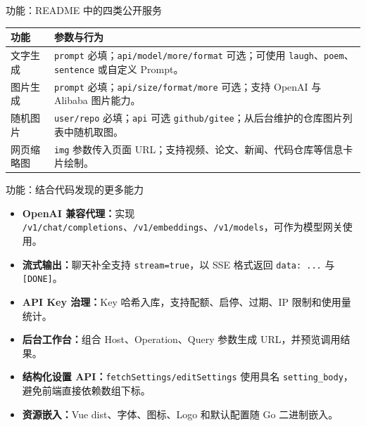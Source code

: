 \documentclass[aspectratio=169,UTF8]{ctexbeamer}
\newcommand{\code}[1]{\texttt{#1}}
\begin{document}
\begin{frame}{功能：README 中的四类公开服务}
  \begin{table}
    \small
    \begin{tabularx}{\linewidth}{lX}
      \toprule
      功能 & 参数与行为 \\
      \midrule
      文字生成 & \code{prompt} 必填；\code{api/model/more/format} 可选；可使用 \code{laugh}、\code{poem}、\code{sentence} 或自定义 Prompt。 \\
      图片生成 & \code{prompt} 必填；\code{api/size/format/more} 可选；支持 OpenAI 与 Alibaba 图片能力。 \\
      随机图片 & \code{user/repo} 必填；\code{api} 可选 \code{github/gitee}；从后台维护的仓库图片列表中随机取图。 \\
      网页缩略图 & \code{img} 参数传入页面 URL；支持视频、论文、新闻、代码仓库等信息卡片绘制。 \\
      \bottomrule
    \end{tabularx}
  \end{table}
\end{frame}

\begin{frame}{功能：结合代码发现的更多能力}
  \begin{itemize}
    \item \textbf{OpenAI 兼容代理：}实现 \code{/v1/chat/completions}、\code{/v1/embeddings}、\code{/v1/models}，可作为模型网关使用。
    \item \textbf{流式输出：}聊天补全支持 \code{stream=true}，以 SSE 格式返回 \code{data: ...} 与 \code{[DONE]}。
    \item \textbf{API Key 治理：}Key 哈希入库，支持配额、启停、过期、IP 限制和使用量统计。
    \item \textbf{后台工作台：}组合 Host、Operation、Query 参数生成 URL，并预览调用结果。
    \item \textbf{结构化设置 API：}\code{fetchSettings/editSettings} 使用具名 \code{setting\_body}，避免前端直接依赖数组下标。
    \item \textbf{资源嵌入：}Vue dist、字体、图标、Logo 和默认配置随 Go 二进制嵌入。
  \end{itemize}
\end{frame}
\end{document}
